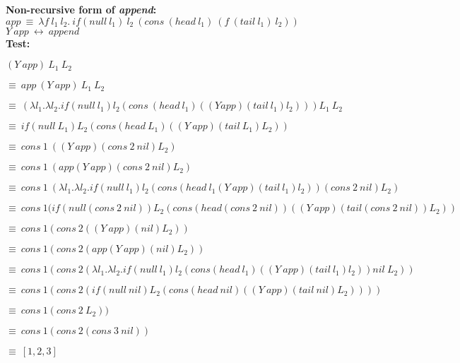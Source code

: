 \textbf{Non-recursive form of \textit{append}:} \\ $app~\equiv~
\lambda f~l_1~l_2.~if (null~l_1)~l_2~(cons~(head~
l_1)~(f~(tail~l_1)~l_2))$\\
$Y~app~\leftrightarrow~append$\\

\noindent\textbf{Test:}

$(Y~app)~L_1~L_2$

$\equiv~app~(Y~app)~L_1~L_2$

$\equiv~(\lambda l_1.\lambda l_2. if (null
~l_1)l_2(cons~(head~l_1)((Y app)(tail~l_1)l_2)))L_1~L_2$

$\equiv ~if(null~L_1)L_2(cons(head~L_1)((Y~app)(tail~L_1)L_2))$

$\equiv~cons~1~((Y~app)(cons~2~nil)L_2)$

$\equiv~cons~1~(app(Y~app)(cons~2~nil)L_2)$

$\equiv~cons~1~(\lambda l_1.\lambda l_2. if
(null~l_1)l_2(cons(head~l_1(Y~app)(tail~l_1)l_2))(cons~2~nil)L_2)$

$\equiv~cons~1 (if(null(cons~2~nil))L_2(cons(head(cons~2~nil))((Y~
app)(tail(cons~2~nil))L_2))$

$\equiv~cons~1(cons~2((Y~app)(nil)L_2))$

$\equiv~cons~1(cons~2(app(Y~app)(nil)L_2))$

$\equiv~cons~1(cons~2(\lambda l_1.\lambda
l_2.if(null~l_1)l_2(cons(head~l_1)((Y~app)(tail~l_1)l_2))nil~L_2))$

$\equiv~cons~1(cons~2(if(null~nil)L_2(cons(head~nil)((Y~app)(tail~nil)L_2))))$

$\equiv~cons~1(cons~2~L_2))$

$\equiv~cons~1(cons~2(cons~3~nil))$

$\equiv~[1,2,3]$